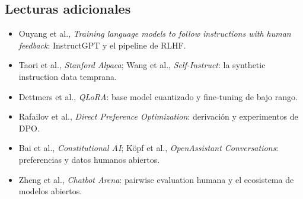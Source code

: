 \documentclass[a4paper]{article}
\begin{document}
\subsection{Lecturas adicionales}

\begin{itemize}
  \item Ouyang et al., \emph{Training language models to follow instructions with human feedback}: InstructGPT y el pipeline de RLHF.
  \item Taori et al., \emph{Stanford Alpaca}; Wang et al., \emph{Self-Instruct}: la synthetic instruction data temprana.
  \item Dettmers et al., \emph{QLoRA}: base model cuantizado y fine-tuning de bajo rango.
  \item Rafailov et al., \emph{Direct Preference Optimization}: derivación y experimentos de DPO.
  \item Bai et al., \emph{Constitutional AI}; Köpf et al., \emph{OpenAssistant Conversations}: preferencias y datos humanos abiertos.
  \item Zheng et al., \emph{Chatbot Arena}: pairwise evaluation humana y el ecosistema de modelos abiertos.
\end{itemize}
\end{document}
